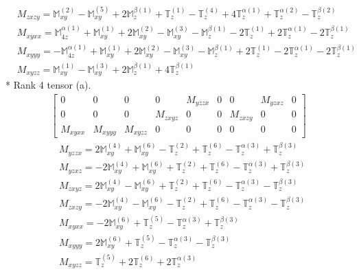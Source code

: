 \documentclass[fleqn,8pt,landscape]{jsarticle}
\begin{document}
\begin{align*}
& M_{zxzy} = \mathbb{M}_{xy}^{(2)} - \mathbb{M}_{xy}^{(5)} + 2 \mathbb{M}_{z}^{\beta(1)} + \mathbb{T}_{z}^{(1)} - \mathbb{T}_{z}^{(4)} + 4 \mathbb{T}_{z}^{\alpha(1)} + \mathbb{T}_{z}^{\alpha(2)} - \mathbb{T}_{z}^{\beta(2)} \\
& M_{xyxx} = \mathbb{M}_{4z}^{\alpha(1)} + \mathbb{M}_{xy}^{(1)} + 2 \mathbb{M}_{xy}^{(2)} - \mathbb{M}_{xy}^{(3)} - \mathbb{M}_{z}^{\beta(1)} - 2 \mathbb{T}_{z}^{(1)} + 2 \mathbb{T}_{z}^{\alpha(1)} - 2 \mathbb{T}_{z}^{\beta(1)} \\
& M_{xyyy} = - \mathbb{M}_{4z}^{\alpha(1)} + \mathbb{M}_{xy}^{(1)} + 2 \mathbb{M}_{xy}^{(2)} - \mathbb{M}_{xy}^{(3)} - \mathbb{M}_{z}^{\beta(1)} + 2 \mathbb{T}_{z}^{(1)} - 2 \mathbb{T}_{z}^{\alpha(1)} - 2 \mathbb{T}_{z}^{\beta(1)} \\
& M_{xyzz} = \mathbb{M}_{xy}^{(1)} - \mathbb{M}_{xy}^{(3)} + 2 \mathbb{M}_{z}^{\beta(1)} + 4 \mathbb{T}_{z}^{\beta(1)}
\end{align*}
* Rank 4 tensor (a).
\begin{align*}
\begin{bmatrix} 0 & 0 & 0 & 0 & M_{yzzx} & 0 & 0 & M_{yzxz} & 0 \\ 0 & 0 & 0 & M_{zxyz} & 0 & 0 & M_{zxzy} & 0 & 0 \\ M_{xyxx} & M_{xyyy} & M_{xyzz} & 0 & 0 & 0 & 0 & 0 & 0 \end{bmatrix}
\end{align*}
\begin{align*}
& M_{yzzx} = 2 \mathbb{M}_{xy}^{(4)} + \mathbb{M}_{xy}^{(6)} - \mathbb{T}_{z}^{(2)} + \mathbb{T}_{z}^{(6)} - \mathbb{T}_{z}^{\alpha(3)} + \mathbb{T}_{z}^{\beta(3)} \\
& M_{yzxz} = - 2 \mathbb{M}_{xy}^{(4)} + \mathbb{M}_{xy}^{(6)} + \mathbb{T}_{z}^{(2)} + \mathbb{T}_{z}^{(6)} - \mathbb{T}_{z}^{\alpha(3)} + \mathbb{T}_{z}^{\beta(3)} \\
& M_{zxyz} = 2 \mathbb{M}_{xy}^{(4)} - \mathbb{M}_{xy}^{(6)} + \mathbb{T}_{z}^{(2)} + \mathbb{T}_{z}^{(6)} - \mathbb{T}_{z}^{\alpha(3)} - \mathbb{T}_{z}^{\beta(3)} \\
& M_{zxzy} = - 2 \mathbb{M}_{xy}^{(4)} - \mathbb{M}_{xy}^{(6)} - \mathbb{T}_{z}^{(2)} + \mathbb{T}_{z}^{(6)} - \mathbb{T}_{z}^{\alpha(3)} - \mathbb{T}_{z}^{\beta(3)} \\
& M_{xyxx} = - 2 \mathbb{M}_{xy}^{(6)} + \mathbb{T}_{z}^{(5)} - \mathbb{T}_{z}^{\alpha(3)} + \mathbb{T}_{z}^{\beta(3)} \\
& M_{xyyy} = 2 \mathbb{M}_{xy}^{(6)} + \mathbb{T}_{z}^{(5)} - \mathbb{T}_{z}^{\alpha(3)} - \mathbb{T}_{z}^{\beta(3)} \\
& M_{xyzz} = \mathbb{T}_{z}^{(5)} + 2 \mathbb{T}_{z}^{(6)} + 2 \mathbb{T}_{z}^{\alpha(3)}
\end{align*}
\end{document}
